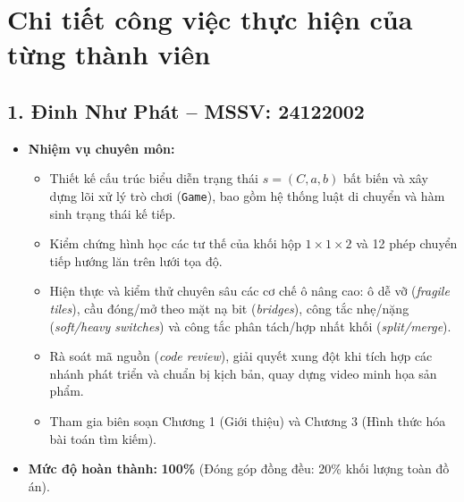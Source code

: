 \section*{Chi tiết công việc thực hiện của từng thành viên}

\subsection*{1. Đinh Như Phát -- MSSV: 24122002}
\begin{itemize}
    \item \textbf{Nhiệm vụ chuyên môn:}
    \begin{itemize}
        \item Thiết kế cấu trúc biểu diễn trạng thái $s = (C, a, b)$ bất biến và xây dựng lõi xử lý trò chơi (\texttt{Game}), bao gồm hệ thống luật di chuyển và hàm sinh trạng thái kế tiếp.
        \item Kiểm chứng hình học các tư thế của khối hộp $1 \times 1 \times 2$ và 12 phép chuyển tiếp hướng lăn trên lưới tọa độ.
        \item Hiện thực và kiểm thử chuyên sâu các cơ chế ô nâng cao: ô dễ vỡ (\textit{fragile tiles}), cầu đóng/mở theo mặt nạ bit (\textit{bridges}), công tắc nhẹ/nặng (\textit{soft/heavy switches}) và công tắc phân tách/hợp nhất khối (\textit{split/merge}).
        \item Rà soát mã nguồn (\textit{code review}), giải quyết xung đột khi tích hợp các nhánh phát triển và chuẩn bị kịch bản, quay dựng video minh họa sản phẩm.
        \item Tham gia biên soạn Chương 1 (Giới thiệu) và Chương 3 (Hình thức hóa bài toán tìm kiếm).
    \end{itemize}
    \item \textbf{Mức độ hoàn thành:} \textbf{100\%} (Đóng góp đồng đều: 20\% khối lượng toàn đồ án).
\end{itemize}

